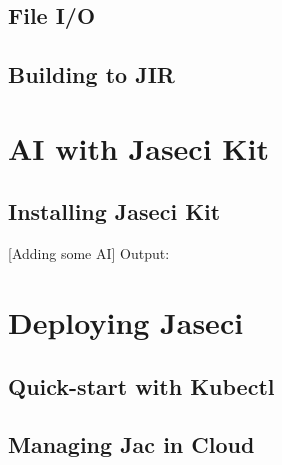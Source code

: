 \subsection{File I/O}


\subsection{Building to JIR}

\section{AI with Jaseci Kit}
\subsection{Installing Jaseci Kit}
[Adding some AI]
Output:

\section{Deploying Jaseci}

\subsection{Quick-start with Kubectl}

\subsection{Managing Jac in Cloud}